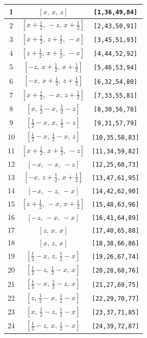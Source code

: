 \documentclass[fleqn,8pt]{jsarticle}
\begin{document}
\begin{longtable}{ccc}
1 & $\left[ x,\, x,\, z \right]$ & {\tt [1,36,49,84]} \\ \hline
2 & $\left[ x + \frac{1}{2},\, - z,\, x + \frac{1}{2} \right]$ & {\tt [2,43,50,91]} \\ \hline
3 & $\left[ x + \frac{1}{2},\, z + \frac{1}{2},\, - x \right]$ & {\tt [3,45,51,93]} \\ \hline
4 & $\left[ z + \frac{1}{2},\, x + \frac{1}{2},\, - x \right]$ & {\tt [4,44,52,92]} \\ \hline
5 & $\left[ - z,\, x + \frac{1}{2},\, x + \frac{1}{2} \right]$ & {\tt [5,46,53,94]} \\ \hline
6 & $\left[ - x,\, x + \frac{1}{2},\, z + \frac{1}{2} \right]$ & {\tt [6,32,54,80]} \\ \hline
7 & $\left[ x + \frac{1}{2},\, - x,\, z + \frac{1}{2} \right]$ & {\tt [7,33,55,81]} \\ \hline
8 & $\left[ x,\, \frac{1}{2} - x,\, \frac{1}{2} - z \right]$ & {\tt [8,30,56,78]} \\ \hline
9 & $\left[ \frac{1}{2} - x,\, x,\, \frac{1}{2} - z \right]$ & {\tt [9,31,57,79]} \\ \hline
10 & $\left[ \frac{1}{2} - x,\, \frac{1}{2} - x,\, z \right]$ & {\tt [10,35,58,83]} \\ \hline
11 & $\left[ x + \frac{1}{2},\, x + \frac{1}{2},\, - z \right]$ & {\tt [11,34,59,82]} \\ \hline
12 & $\left[ - x,\, - x,\, - z \right]$ & {\tt [12,25,60,73]} \\ \hline
13 & $\left[ - x,\, z + \frac{1}{2},\, x + \frac{1}{2} \right]$ & {\tt [13,47,61,95]} \\ \hline
14 & $\left[ - x,\, - z,\, - x \right]$ & {\tt [14,42,62,90]} \\ \hline
15 & $\left[ z + \frac{1}{2},\, - x,\, x + \frac{1}{2} \right]$ & {\tt [15,48,63,96]} \\ \hline
16 & $\left[ - z,\, - x,\, - x \right]$ & {\tt [16,41,64,89]} \\ \hline
17 & $\left[ z,\, x,\, x \right]$ & {\tt [17,40,65,88]} \\ \hline
18 & $\left[ x,\, z,\, x \right]$ & {\tt [18,38,66,86]} \\ \hline
19 & $\left[ \frac{1}{2} - x,\, z,\, \frac{1}{2} - x \right]$ & {\tt [19,26,67,74]} \\ \hline
20 & $\left[ \frac{1}{2} - z,\, \frac{1}{2} - x,\, x \right]$ & {\tt [20,28,68,76]} \\ \hline
21 & $\left[ \frac{1}{2} - x,\, \frac{1}{2} - z,\, x \right]$ & {\tt [21,27,69,75]} \\ \hline
22 & $\left[ z,\, \frac{1}{2} - x,\, \frac{1}{2} - x \right]$ & {\tt [22,29,70,77]} \\ \hline
23 & $\left[ x,\, \frac{1}{2} - z,\, \frac{1}{2} - x \right]$ & {\tt [23,37,71,85]} \\ \hline
24 & $\left[ \frac{1}{2} - z,\, x,\, \frac{1}{2} - x \right]$ & {\tt [24,39,72,87]} \\
\end{longtable}
\end{document}
